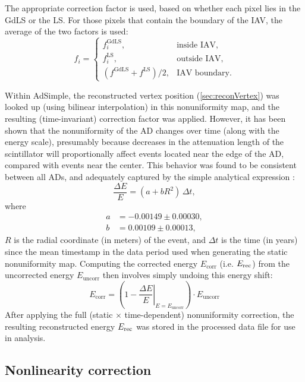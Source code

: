 \documentclass[../thesis.tex]{subfiles}
\begin{document}
The appropriate correction factor is used, based on whether each pixel lies in the GdLS or the LS. For those pixels that contain the boundary of the IAV, the average of the two factors is used:
\begin{equation}
  f_i =
  \begin{cases}
    f^{\mathrm{GdLS}}_i, & \text{inside IAV,} \\
    f^{\mathrm{LS}}_i, & \text{outside IAV,} \\
    (f^{\mathrm{GdLS}} + f^{\mathrm{LS}})/2, & \text{IAV boundary.}
  \end{cases}
\end{equation}

Within AdSimple, the reconstructed vertex position (\autoref{sec:reconVertex}) was looked up (using bilinear interpolation) in this nonuniformity map, and the resulting (time-invariant) correction factor was applied. However, it has been shown that the nonuniformity of the AD changes over time (along with the energy scale), presumably because decreases in the attenuation length of the scintillator will proportionally affect events located near the edge of the AD, compared with events near the center. This behavior was found to be consistent between all ADs, and adequately captured by the simple analytical expression \cite[p. 16]{yuryNonUni2}:
\begin{equation}
  \frac{\Delta E}{E} = (a + b R^2)\, \Delta t,
\end{equation}
where
\begin{align*}
  a &= -0.00149 \pm 0.00030,\\
  b &= 0.00109 \pm 0.00013,
\end{align*}
$R$ is the radial coordinate (in meters) of the event, and $\Delta t$ is the time (in years) since the mean timestamp in the data period used when generating the static nonuniformity map. Computing the corrected energy $E_{\mathrm{corr}}$ (i.e. $E_\mathrm{rec}$) from the uncorrected energy $E_{\mathrm{uncorr}}$ then involves simply undoing this energy shift:
\begin{equation}
  E_{\mathrm{corr}} = \left( 1 - \left.\frac{\Delta E}{E}\right|_{E=E_{\mathrm{uncorr}}} \right) \cdot E_{\mathrm{uncorr}}
\end{equation}
After applying the full (static $\times$ time-dependent) nonuniformity correction, the resulting reconstructed energy $E_\mathrm{rec}$ was stored in the processed data file for use in analysis.

\subsection{Nonlinearity correction}
\label{sec:reconEnergyNL}
\end{document}
